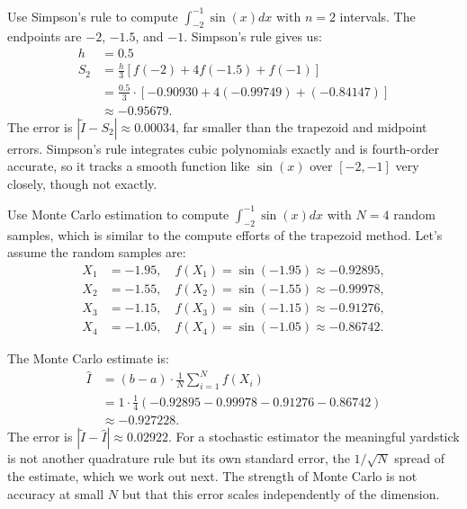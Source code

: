 \vspace{2em}
 Use Simpson's rule to compute $\int_{-2}^{-1} \sin(x) dx$ with $n=2$ intervals.
The endpoints are $-2$, $-1.5$, and $-1$. Simpson's rule gives us:
\begin{align*}
    h &= 0.5 \\
    S_2 &= \frac{h}{3} [f(-2) + 4f(-1.5) + f(-1)] \\
        &= \frac{0.5}{3} \cdot [-0.90930 + 4(-0.99749) + (-0.84147)] \\
        &\approx -0.95679.
\end{align*}
The error is $|\tilde{I} - S_2| \approx 0.00034$, far smaller than the trapezoid and midpoint errors. Simpson's rule integrates cubic polynomials exactly and is fourth-order accurate, so it tracks a smooth function like $\sin(x)$ over $[-2, -1]$ very closely, though not exactly.




 Use Monte Carlo estimation to compute $\int_{-2}^{-1} \sin(x) dx$ with $N=4$ random samples, 
which is similar to the compute efforts of the trapezoid method. Let's assume the random samples are: 
\begin{align*}
    X_1 &= -1.95, \quad f(X_1) = \sin(-1.95) \approx -0.92895, \\
    X_2 &= -1.55, \quad f(X_2) = \sin(-1.55) \approx -0.99978, \\
    X_3 &= -1.15, \quad f(X_3) = \sin(-1.15) \approx -0.91276, \\
    X_4 &= -1.05, \quad f(X_4) = \sin(-1.05) \approx -0.86742.
\end{align*}

The Monte Carlo estimate is:
\begin{align*}
    \hat{I} &= (b - a) \cdot \frac{1}{N} \sum_{i=1}^{N} f(X_i) \\
            &= 1 \cdot \frac{1}{4} (-0.92895 - 0.99978 - 0.91276 - 0.86742) \\
            &\approx -0.927228.
\end{align*}
The error is $|\tilde{I} - \hat{I}| \approx 0.02922$. For a stochastic estimator the meaningful yardstick is not another quadrature rule but its own standard error, the $1/\sqrt{N}$ spread of the estimate, which we work out next. The strength of Monte Carlo is not accuracy at small $N$ but that this error scales independently of the dimension.




